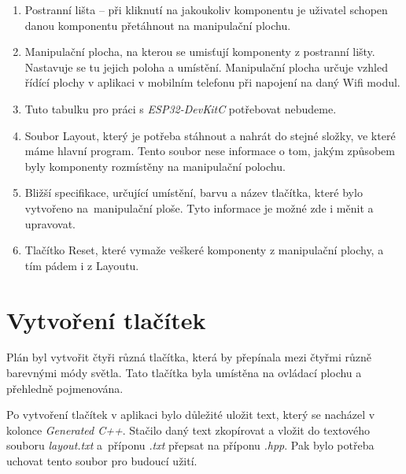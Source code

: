 \begin{enumerate}
	\item Postranní lišta -- při kliknutí na jakoukoliv komponentu je uživatel schopen danou komponentu přetáhnout na manipulační plochu.
	\item Manipulační plocha, na kterou se umisťují komponenty z postranní lišty. Nastavuje se tu jejich poloha a umístění. Manipulační plocha určuje vzhled řídící plochy v aplikaci v mobilním telefonu při napojení na daný Wifi modul. 
	\item  Tuto tabulku pro práci s \textit{ESP32-DevKitC} potřebovat nebudeme.
	\item  Soubor Layout, který je potřeba stáhnout a nahrát do stejné složky, ve které máme hlavní program. Tento soubor nese informace o tom, jakým způsobem byly komponenty rozmístěny na manipulační polochu.
	\item Bližší specifikace, určující umístění, barvu a název tlačítka, které bylo vytvořeno na~manipulační ploše. Tyto informace je možné zde i měnit a upravovat. 
	\item Tlačítko Reset, které vymaže veškeré komponenty z manipulační plochy, a tím pádem i z Layoutu.
\end{enumerate}



\section{Vytvoření tlačítek}
Plán byl vytvořit čtyři různá tlačítka, která by přepínala mezi čtyřmi různě barevnými módy světla. Tato tlačítka byla umístěna na ovládací plochu a přehledně pojmenována. 

Po vytvoření tlačítek v aplikaci bylo důležité uložit text, který se nacházel v kolonce \textit{Generated C++}. Stačilo daný text zkopírovat a vložit do textového souboru \textit{layout.txt} a~příponu \textit{.txt} přepsat na příponu \textit{.hpp}. Pak bylo potřeba uchovat tento soubor pro budoucí užití.
\newpage


